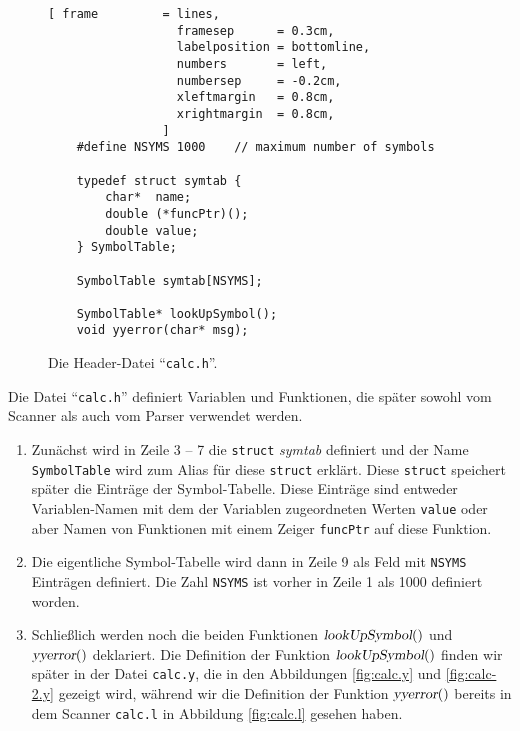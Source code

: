 \begin{figure}[!ht]
\centering
\begin{Verbatim}[ frame         = lines, 
                  framesep      = 0.3cm, 
                  labelposition = bottomline,
                  numbers       = left,
                  numbersep     = -0.2cm,
                  xleftmargin   = 0.8cm,
                  xrightmargin  = 0.8cm,
                ]
    #define NSYMS 1000    // maximum number of symbols 
    
    typedef struct symtab {
        char*  name;
        double (*funcPtr)();
        double value;
    } SymbolTable;
    
    SymbolTable symtab[NSYMS];
    
    SymbolTable* lookUpSymbol();
    void yyerror(char* msg);
\end{Verbatim}
\vspace*{-0.3cm}
\caption{Die Header-Datei ``\texttt{calc.h}''.}
\label{fig:calc.h}
\end{figure}
Die Datei ``\texttt{calc.h}'' definiert Variablen und Funktionen, die sp\"ater sowohl
vom Scanner als auch vom Parser verwendet werden.  
\begin{enumerate}
\item Zun\"achst wird in Zeile 3 -- 7 die \texttt{struct} \textsl{symtab} definiert
      und der Name \texttt{SymbolTable} wird zum Alias f\"ur diese \texttt{struct}
      erkl\"art.  Diese \texttt{struct} speichert sp\"ater die Eintr\"age der
      Symbol-Tabelle. Diese Eintr\"age sind entweder Variablen-Namen mit dem
      der Variablen zugeordneten Werten \texttt{value} oder aber Namen von
      Funktionen mit einem Zeiger \texttt{funcPtr} auf diese Funktion.
\item Die eigentliche Symbol-Tabelle wird dann in Zeile 9 als Feld mit
      \texttt{NSYMS} Eintr\"agen definiert.  Die Zahl \texttt{NSYMS} ist vorher in
      Zeile 1 als 1000 definiert worden.
\item Schlie{\ss}lich werden noch die beiden Funktionen $\textsl{lookUpSymbol}()$
      und $\textsl{yyerror}()$ deklariert.  Die Definition der Funktion
      $\textsl{lookUpSymbol}()$ finden wir sp\"ater in der Datei \texttt{calc.y},
      die in den Abbildungen \ref{fig:calc.y} und \ref{fig:calc-2.y}
      gezeigt wird, w\"ahrend wir die Definition der Funktion
      $\textsl{yyerror}()$ bereits in dem Scanner \texttt{calc.l} in  Abbildung
      \ref{fig:calc.l} gesehen haben.
\end{enumerate}


